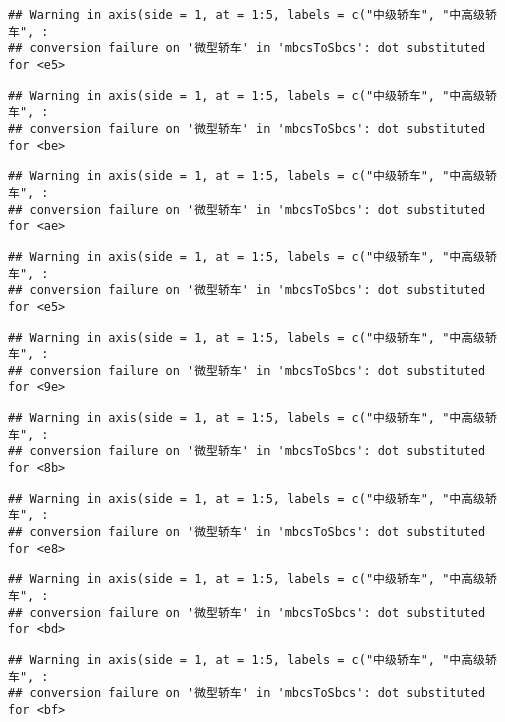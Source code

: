 \documentclass[]{article}
\begin{document}
\begin{verbatim}
## Warning in axis(side = 1, at = 1:5, labels = c("中级轿车", "中高级轿车", :
## conversion failure on '微型轿车' in 'mbcsToSbcs': dot substituted for <e5>
\end{verbatim}

\begin{verbatim}
## Warning in axis(side = 1, at = 1:5, labels = c("中级轿车", "中高级轿车", :
## conversion failure on '微型轿车' in 'mbcsToSbcs': dot substituted for <be>
\end{verbatim}

\begin{verbatim}
## Warning in axis(side = 1, at = 1:5, labels = c("中级轿车", "中高级轿车", :
## conversion failure on '微型轿车' in 'mbcsToSbcs': dot substituted for <ae>
\end{verbatim}

\begin{verbatim}
## Warning in axis(side = 1, at = 1:5, labels = c("中级轿车", "中高级轿车", :
## conversion failure on '微型轿车' in 'mbcsToSbcs': dot substituted for <e5>
\end{verbatim}

\begin{verbatim}
## Warning in axis(side = 1, at = 1:5, labels = c("中级轿车", "中高级轿车", :
## conversion failure on '微型轿车' in 'mbcsToSbcs': dot substituted for <9e>
\end{verbatim}

\begin{verbatim}
## Warning in axis(side = 1, at = 1:5, labels = c("中级轿车", "中高级轿车", :
## conversion failure on '微型轿车' in 'mbcsToSbcs': dot substituted for <8b>
\end{verbatim}

\begin{verbatim}
## Warning in axis(side = 1, at = 1:5, labels = c("中级轿车", "中高级轿车", :
## conversion failure on '微型轿车' in 'mbcsToSbcs': dot substituted for <e8>
\end{verbatim}

\begin{verbatim}
## Warning in axis(side = 1, at = 1:5, labels = c("中级轿车", "中高级轿车", :
## conversion failure on '微型轿车' in 'mbcsToSbcs': dot substituted for <bd>
\end{verbatim}

\begin{verbatim}
## Warning in axis(side = 1, at = 1:5, labels = c("中级轿车", "中高级轿车", :
## conversion failure on '微型轿车' in 'mbcsToSbcs': dot substituted for <bf>
\end{verbatim}
\end{document}
